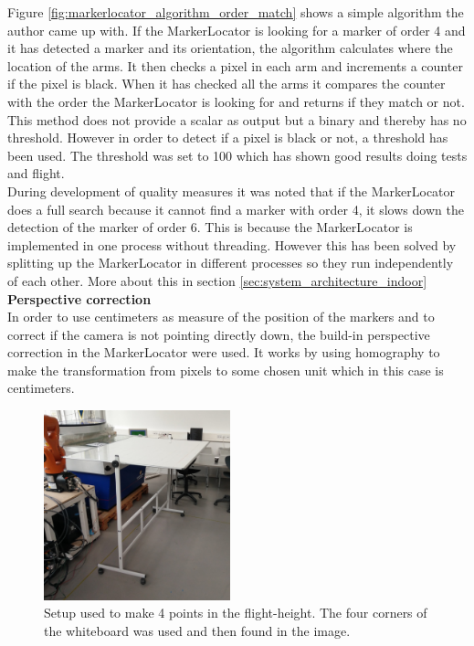 Figure \ref{fig:markerlocator_algorithm_order_match} shows a simple algorithm the author came up with.
If the MarkerLocator is looking for a marker of order 4 and it has detected a marker and its orientation, the algorithm calculates where the location of the arms. It then checks a pixel in each arm and increments a counter if the pixel is black. When it has checked all the arms it compares the counter with the order the MarkerLocator is looking for and returns if they match or not. 
This method does not provide a scalar as output but a binary and thereby has no threshold. However in order to detect if a pixel is black or not, a threshold has been used. The threshold was set to 100 which has shown good results doing tests and flight. \\

During development of quality measures it was noted that if the MarkerLocator does a full search because it cannot find a marker with order 4, it slows down the detection of the marker of order 6. This is because the MarkerLocator is implemented in one process without threading. However this has been solved by splitting up the MarkerLocator in different processes so they run independently of each other. More about this in section  \ref{sec:system_architecture_indoor} \\

\textbf{Perspective correction} \\
In order to use centimeters as measure of the position of the markers and to correct if the camera is not pointing directly down, the build-in perspective correction in the MarkerLocator were used.
It works by using homography\cite{janeriksolem2012} to make the transformation from pixels to some chosen unit which in this case is centimeters.
\begin{figure}
  \vspace{-20pt}
  \begin{center}
    \includegraphics[width=0.48\textwidth]{graphics/whiteboard_tilted.jpg}
  \end{center}
  \vspace{-20pt}
  \caption{Setup used to make 4 points in the flight-height. The four corners of the whiteboard was used and then found in the image. } \label{fig:whiteboard_setup}
  \vspace{-10pt}
\end{figure}

